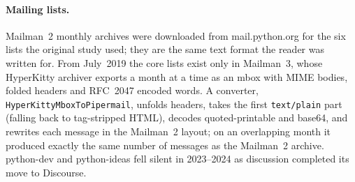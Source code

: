 \documentclass[sigconf,screen]{acmart}
\begin{document}
\begin{table}[t]
\caption{Sources of the corpus extension (November~2018 to September~2026).}
\label{tab:sources}
\footnotesize
\setlength{\tabcolsep}{3.5pt}
\end{table}

\paragraph{Mailing lists.} Mailman~2 monthly archives were downloaded from mail.python.org for the six lists the original study used; they are the same text format the reader was written for. From July~2019 the core lists exist only in Mailman~3, whose HyperKitty archiver exports a month at a time as an mbox with MIME bodies, folded headers and RFC~2047 encoded words. A converter, \texttt{HyperKittyMbox\allowbreak ToPipermail}, unfolds headers, takes the first \texttt{text/plain} part (falling back to tag-stripped HTML), decodes quoted-printable and base64, and rewrites each message in the Mailman~2 layout; on an overlapping month it produced exactly the same number of messages as the Mailman~2 archive. python-dev and python-ideas fell silent in 2023--2024 as discussion completed its move to Discourse.
\end{document}
